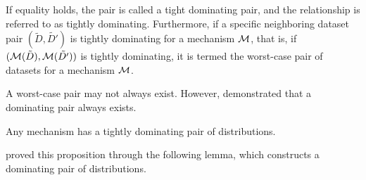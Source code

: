 \documentclass{article}
\begin{document}
If equality holds, the pair is called a tight dominating pair, and the relationship is referred to as tightly dominating. Furthermore, if a specific neighboring dataset pair $(\tilde{D}, \tilde{D'})$ is tightly dominating for a mechanism ${\mathcal{M}}$, that is, if $({\mathcal{M}}(\tilde{D}),{\mathcal{M}}(\tilde{D'}))$ is tightly dominating, it is termed the worst-case pair of datasets for a mechanism ${\mathcal{M}}$.

A worst-case pair may not always exist. However, \cite{zhu2022optimal} demonstrated that a dominating pair always exists.
\begin{proposition}\label{domiexist}
    Any mechanism has a tightly dominating pair of distributions.
\end{proposition}
\cite{zhu2022optimal} proved this proposition through the following lemma, which constructs a dominating pair of distributions.
\end{document}
